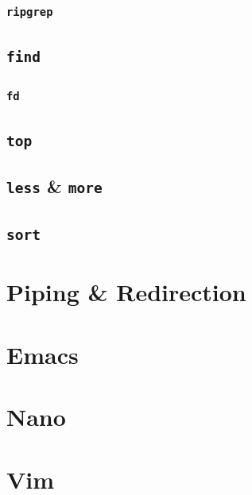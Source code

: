 \documentclass[
]{book}
\begin{document}
\hypertarget{rg}{%
\subsubsection{\texorpdfstring{\texttt{ripgrep}}{ripgrep}}\label{rg}}

\hypertarget{find}{%
\subsection{\texorpdfstring{\texttt{find}}{find}}\label{find}}

\hypertarget{fd}{%
\subsubsection{\texorpdfstring{\texttt{fd}}{fd}}\label{fd}}

\hypertarget{top}{%
\subsection{\texorpdfstring{\texttt{top}}{top}}\label{top}}

\hypertarget{less-and-more}{%
\subsection{\texorpdfstring{\texttt{less} \& \texttt{more}}{less \& more}}\label{less-and-more}}

\hypertarget{sort}{%
\subsection{\texorpdfstring{\texttt{sort}}{sort}}\label{sort}}

\hypertarget{piping-and-redirection}{%
\section{Piping \& Redirection}\label{piping-and-redirection}}

\hypertarget{emacs}{%
\section{Emacs}\label{emacs}}

\hypertarget{nano}{%
\section{Nano}\label{nano}}

\hypertarget{vim}{%
\section{Vim}\label{vim}}
\end{document}
